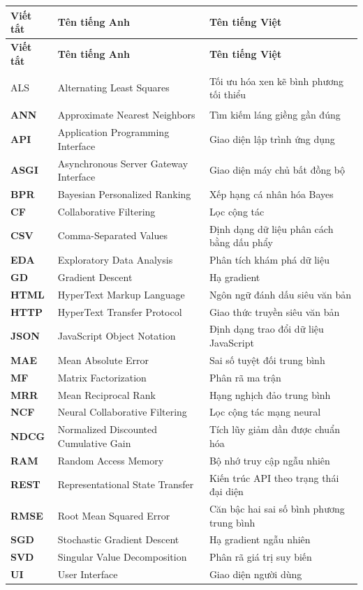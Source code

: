 \documentclass[../BTL.tex]{subfiles}
\begin{document}
\begin{longtable}{>{\bfseries}l p{5.5cm} p{6.5cm}}
    \hline
    \textbf{Viết tắt} & \textbf{Tên tiếng Anh} & \textbf{Tên tiếng Việt} \\
    \hline
    \endfirsthead
    \hline
    \textbf{Viết tắt} & \textbf{Tên tiếng Anh} & \textbf{Tên tiếng Việt} \\
    \hline
    \endhead
    \hline
    \endfoot

    ALS   & Alternating Least Squares
          & Tối ưu hóa xen kẽ bình phương tối thiểu \\
    ANN   & Approximate Nearest Neighbors
          & Tìm kiếm láng giềng gần đúng \\
    API   & Application Programming Interface
          & Giao diện lập trình ứng dụng \\
    ASGI  & Asynchronous Server Gateway Interface
          & Giao diện máy chủ bất đồng bộ \\
    BPR   & Bayesian Personalized Ranking
          & Xếp hạng cá nhân hóa Bayes \\
    CF    & Collaborative Filtering
          & Lọc cộng tác \\
    CSV   & Comma-Separated Values
          & Định dạng dữ liệu phân cách bằng dấu phẩy \\
    EDA   & Exploratory Data Analysis
          & Phân tích khám phá dữ liệu \\
    GD    & Gradient Descent
          & Hạ gradient \\
    HTML  & HyperText Markup Language
          & Ngôn ngữ đánh dấu siêu văn bản \\
    HTTP  & HyperText Transfer Protocol
          & Giao thức truyền siêu văn bản \\
    JSON  & JavaScript Object Notation
          & Định dạng trao đổi dữ liệu JavaScript \\
    MAE   & Mean Absolute Error
          & Sai số tuyệt đối trung bình \\
    MF    & Matrix Factorization
          & Phân rã ma trận \\
    MRR   & Mean Reciprocal Rank
          & Hạng nghịch đảo trung bình \\
    NCF   & Neural Collaborative Filtering
          & Lọc cộng tác mạng neural \\
    NDCG  & Normalized Discounted Cumulative Gain
          & Tích lũy giảm dần được chuẩn hóa \\
    RAM   & Random Access Memory
          & Bộ nhớ truy cập ngẫu nhiên \\
    REST  & Representational State Transfer
          & Kiến trúc API theo trạng thái đại diện \\
    RMSE  & Root Mean Squared Error
          & Căn bậc hai sai số bình phương trung bình \\
    SGD   & Stochastic Gradient Descent
          & Hạ gradient ngẫu nhiên \\
    SVD   & Singular Value Decomposition
          & Phân rã giá trị suy biến \\
    UI    & User Interface
          & Giao diện người dùng \\
    \hline
\end{longtable}
\end{document}
